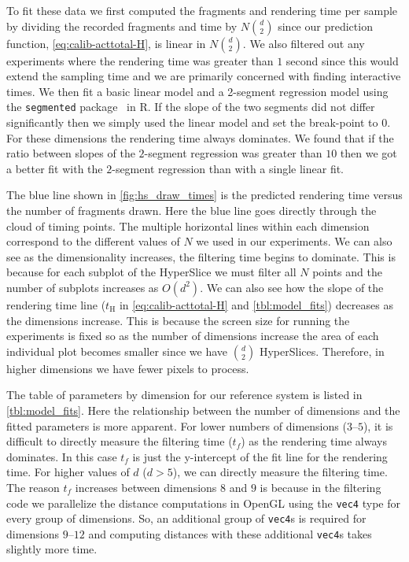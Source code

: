 To fit these data we first computed the fragments and rendering time per 
sample by dividing the recorded fragments and time by $N {d \choose 2}$
since our prediction function, \autoref{eq:calib-acttotal-H}, is linear in $N {d
\choose 2}$.  We also filtered out any experiments where the rendering time was
greater than $1$ second since this would extend the sampling time and we
are primarily concerned with finding interactive times.  We then fit a basic 
linear model and a 2-segment
regression model using the \texttt{segmented} package~\cite{Muggeo:2008} in R.
If the slope of the two segments did not differ significantly then we simply
used the linear model and set the break-point to $0$.  For these dimensions
the rendering time always dominates.  We found that if the ratio between slopes
of the $2$-segment regression was greater than $10$ then we got a better fit
with the $2$-segment regression than with a single linear fit.

The blue line shown in \autoref{fig:hs_draw_times} is the predicted rendering time
versus the number of fragments drawn.  Here the blue line goes directly through
the cloud of timing points.  The multiple horizontal lines within each dimension
correspond to the different values of $N$ we used in our experiments.
We can also see as the dimensionality increases,
the filtering time begins to dominate.  This is because for each subplot of the
HyperSlice we must filter all $N$ points and the number of subplots increases
as $O(d^2)$.  We can also see how the slope of the rendering time line
($t_\text{H}$ in \autoref{eq:calib-acttotal-H} and \autoref{tbl:model_fits}) decreases as
the dimensions increase. This is because the screen size for running the
experiments is fixed so as the number of dimensions increase the area of each
individual plot becomes smaller since we have $d \choose 2$ HyperSlices.
Therefore, in higher dimensions we have fewer pixels to process. 

The table of parameters by dimension for our reference system is
listed in \autoref{tbl:model_fits}. Here the relationship
between the number of dimensions and the fitted parameters is more apparent.
For lower numbers of dimensions ($3$--$5$), it is difficult to directly measure
the filtering time ($t_f$) as the rendering time always dominates. In this
case $t_f$ is just the y-intercept of the fit line for the rendering time.
For higher values of $d$ ($d>5$), we can directly measure the filtering time.
The reason $t_f$ increases between dimensions $8$ and $9$ is because in the
filtering code we parallelize the distance computations in OpenGL using the
\texttt{vec4} type for every group of dimensions. So, an additional group
of \texttt{vec4}s is required for dimensions $9$--$12$ and computing distances with these additional \texttt{vec4}s takes slightly more time.

